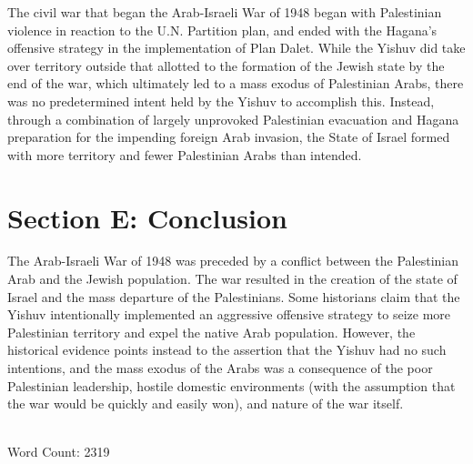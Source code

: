 \documentclass[12pt]{turabian-researchpaper}
\begin{document}
The civil war that began the Arab-Israeli War of 1948 began with Palestinian violence in reaction to the U.N. Partition plan, and ended with the Hagana's offensive strategy in the implementation of Plan Dalet.  While the Yishuv did take over territory outside that allotted to the formation of the Jewish state by the end of the war, which ultimately led to a mass exodus of Palestinian Arabs, there was no predetermined intent held by the Yishuv to accomplish this.  Instead, through a combination of largely unprovoked Palestinian evacuation and Hagana preparation for the impending foreign Arab invasion, the State of Israel formed with more territory and fewer Palestinian Arabs than intended.


\section{Section E: Conclusion}
The Arab-Israeli War of 1948 was preceded by a conflict between the Palestinian Arab and the Jewish population.  The war resulted in the creation of the state of Israel and the mass departure of the Palestinians.  Some historians claim that the Yishuv intentionally implemented an aggressive offensive strategy to seize more Palestinian territory and expel the native Arab population.  However, the historical evidence points instead to the assertion that the Yishuv had no such intentions, and the mass exodus of the Arabs was a consequence of the poor Palestinian leadership, hostile domestic environments (with the assumption that the war would be quickly and easily won), and nature of the war itself.

~\\

Word Count: 2319

\printbibliography[title=Section F: Bibliography]{}
\end{document}
